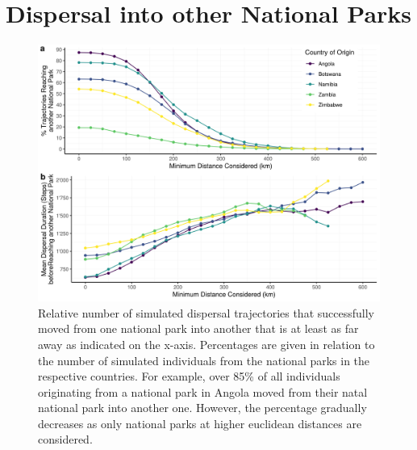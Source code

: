 \documentclass[abstract=off,10pt,a4paper,bibliography=totocnumbered]{article}
\begin{document}
\section{Dispersal into other National Parks}
\begin{figure}[hbtp]
 \begin{center}
  \includegraphics[width = \textwidth]{99_AreasReached.png}
  \caption{Relative number of simulated dispersal trajectories that successfully
  moved from one national park into another that is at least as far away as
  indicated on the x-axis. Percentages are given in relation to the number of
  simulated individuals from the national parks in the respective countries. For
  example, over 85\% of all individuals originating from a national park in
  Angola moved from their natal national park into another one. However, the
  percentage gradually decreases as only national parks at higher euclidean
  distances are considered.}
  \label{AreasReached}
 \end{center}
\end{figure}

\newpage
\begingroup
\singlespacing

\endgroup
\end{document}
